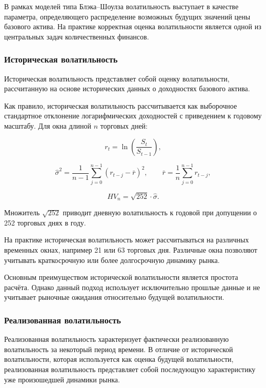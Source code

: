 \documentclass[11pt,a4paper]{article}
\begin{document}
В рамках моделей типа Блэка--Шоулза волатильность выступает в качестве параметра, определяющего распределение возможных будущих значений цены базового актива. На практике корректная оценка волатильности является одной из центральных задач количественных финансов.

\subsubsection{Историческая волатильность}

Историческая волатильность представляет собой оценку волатильности, рассчитанную на основе исторических данных о доходностях базового актива.

Как правило, историческая волатильность рассчитывается как выборочное стандартное отклонение логарифмических доходностей с приведением к годовому масштабу. Для окна длиной $n$ торговых дней:

\begin{equation}
r_t = \ln \left( \frac{S_t}{S_{t-1}} \right),
\end{equation}

\begin{equation}
\hat{\sigma}^2 = \frac{1}{n-1}\sum_{j=0}^{n-1}\!\left(r_{t-j} - \bar{r}\right)^2,
\qquad
\bar{r} = \frac{1}{n}\sum_{j=0}^{n-1} r_{t-j},
\end{equation}

\begin{equation}
HV_n = \sqrt{252}\cdot\hat{\sigma}.
\end{equation}

Множитель $\sqrt{252}$ приводит дневную волатильность к годовой при допущении о 252 торговых днях в году.

На практике историческая волатильность может рассчитываться на различных временных окнах, например 21 или 63 торговых дня. Различные окна позволяют учитывать краткосрочную или более долгосрочную динамику рынка.

Основным преимуществом исторической волатильности является простота расчёта. Однако данный подход использует исключительно прошлые данные и не учитывает рыночные ожидания относительно будущей волатильности.

\subsubsection{Реализованная волатильность}

Реализованная волатильность характеризует фактически реализованную волатильность за некоторый период времени. В отличие от исторической волатильности, которая используется как оценка будущей волатильности, реализованная волатильность представляет собой последующую характеристику уже произошедшей динамики рынка.
\end{document}
